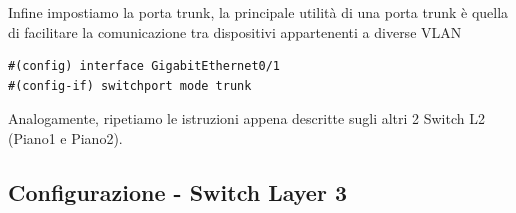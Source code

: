 \documentclass[12pt]{article}
\begin{document}
\begin{center}
            \newpage
            Infine impostiamo la porta trunk, la principale utilità di una porta trunk è quella di facilitare la comunicazione tra dispositivi appartenenti a diverse VLAN
            \begin{tcolorbox}[title=SwitchPianoT, colframe=gray!50!gray, colback=white!50!white]
                \begin{lstlisting}
#(config) interface GigabitEthernet0/1
#(config-if) switchport mode trunk
                \end{lstlisting} 
            \end{tcolorbox}
            Analogamente, ripetiamo le istruzioni appena descritte sugli altri 2 Switch L2 (Piano1 e Piano2). 
        \end{center}

    \subsection{Configurazione - Switch Layer 3}
\end{document}
